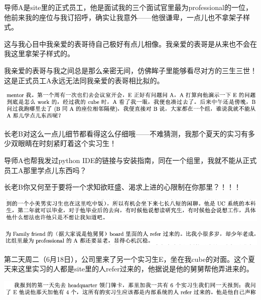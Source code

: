 \documentclass[9pt, b5paper]{article}
\begin{document}
导师A是site里的正式员工，他是面试我的三个面试官里最为professional的一位，他前来我的座位与我订招呼，确实让我意外——他很谦卑，一点儿也不拿架子样式。

这与我心目中我亲爱的表哥待自己极好有点儿相像。我亲爱的表哥是从来也不会在我这里拿架子样式的。

我亲爱的表哥与我之间总是那么亲密无间，仿佛眸子里能够看尽对方的三生三世！这是正式员工A永远无法同我亲爱的表哥相比拟的。 

\begin{center}
\includegraphics[width=.9\linewidth]{./pic/backups_plans_20210505_112820.png}
\end{center}

长老B对这么一点儿细节都看得这么仔细哦——不难猜测，我那个夏天的实习有多少双眼睛在时刻紧盯着这个实习生！

导师A也帮我发过python IDE的链接与安装指南，同在一个组里，我就不能从正式员工A那里学点儿东西吗？

长老B你又何至于要将一个求知欲旺盛、渴求上进的心限制在你那里？！！！

\begin{center}
\includegraphics[width=.9\linewidth]{./pic/backups_plans_20210504_220151.png}
\end{center}

\begin{center}
\includegraphics[width=.9\linewidth]{./pic/backups_plans_20210504_220232.png}
\end{center}

第二天周二（6月18日），公司里来了另一个实习生E，坐在我cube的对面。这个夏天来这里实习的人都是site里的人refer过来的，他据说是他的舅舅帮他弄进来的。 

\begin{center}
\includegraphics[width=.9\linewidth]{./pic/backups_plans_20210505_113837.png}
\end{center}
\end{document}
